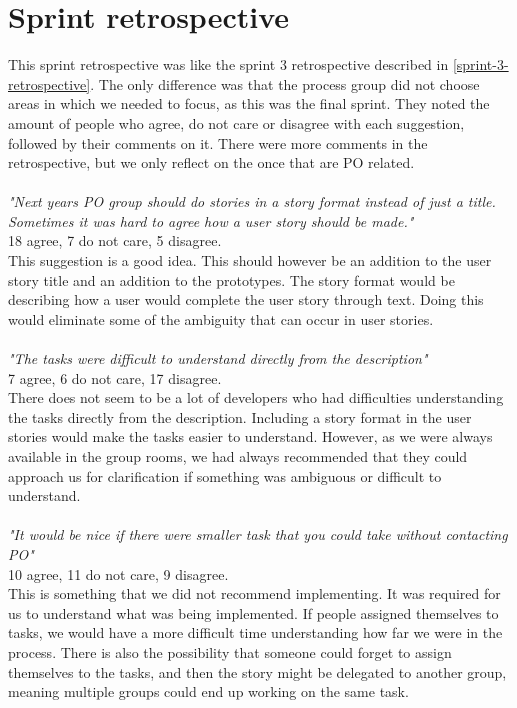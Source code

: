 \section{Sprint retrospective}
This sprint retrospective was like the sprint 3 retrospective described in \autoref{sprint-3-retrospective}.
The only difference was that the process group did not choose areas in which we needed to focus, as this was the final sprint.
They noted the amount of people who agree, do not care or disagree with each suggestion, followed by their comments on it.
There were more comments in the retrospective, but we only reflect on the once that are PO related.
\\\\
\textit{"Next years PO group should do stories in a story format instead of just a title. Sometimes it was hard to agree how a user story should be made."}
\\
18 agree, 7 do not care, 5 disagree.
\\
This suggestion is a good idea. 
This should however be an addition to the user story title and an addition to the prototypes. 
The story format would be describing how a user would complete the user story through text. 
Doing this would eliminate some of the ambiguity that can occur in user stories.
\\\\
\textit{"The tasks were difficult to understand directly from the description"}
\\
7 agree, 6 do not care, 17 disagree.
\\
There does not seem to be a lot of developers who had difficulties understanding the tasks directly from the description. 
Including a story format in the user stories would make the tasks easier to understand.
However, as we were always available in the group rooms, we had always recommended that they could approach us for clarification if something was ambiguous or difficult to understand. 
\\\\
\textit{"It would be nice if there were smaller task that you could take without contacting PO"}
\\
10 agree, 11 do not care, 9 disagree.
\\
This is something that we did not recommend implementing. 
It was required for us to understand what was being implemented. 
If people assigned themselves to tasks, we would have a more difficult time understanding how far we were in the process.
There is also the possibility that someone could forget to assign themselves to the tasks, and then the story might be delegated to another group, meaning multiple groups could end up working on the same task.
